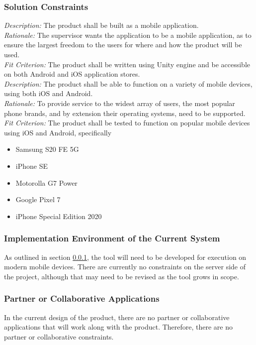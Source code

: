 \documentclass[12pt]{article}
\begin{document}
\subsubsection{Solution Constraints} \label{SolutionConstraints}
\emph{Description:} The product shall be built as a mobile application.\\
\emph{Rationale:} The supervisor wants the application to be a mobile application, as to ensure the largest freedom to the users for where and how the product will be used.\\
\emph{Fit Criterion:} The product shall be written using Unity engine and be accessible on both Android and iOS application stores.\\

\noindent
\emph{Description:} The product shall be able to function on a variety of mobile devices, using both iOS and Android.\\
\emph{Rationale:} To provide service to the widest array of users, the most popular phone brands, and by extension their operating systems, need to be supported.\\
\emph{Fit Criterion:} The product shall be tested to function on popular mobile devices using iOS and Android, specifically 
\begin{itemize}
	\item Samsung S20 FE 5G
    \item iPhone SE
    \item Motorolla G7 Power
    \item Google Pixel 7
    \item iPhone Special Edition 2020
\end{itemize}

\subsubsection{Implementation Environment of the Current System}
As outlined in section \ref{SolutionConstraints}, the tool will need to be developed for execution on modern mobile devices. There are currently no constraints on the server side of the project, although that may need to be revised as the tool grows in scope. 

\subsubsection{Partner or Collaborative Applications}
In the current design of the product, there are no partner or collaborative applications that will
work along with the product. Therefore, there are no partner or collaborative constraints.
\end{document}
